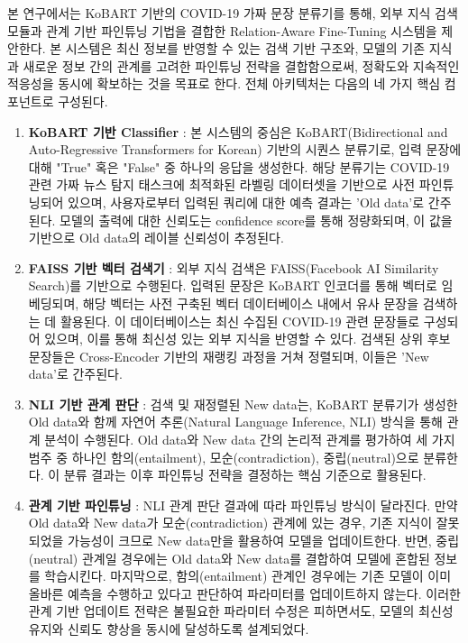 \documentclass[a4paper,fleqn]{cas-sc}
\begin{document}
본 연구에서는 KoBART 기반의 COVID-19 가짜 문장 분류기를 통해, 외부 지식 검색 모듈과 관계 기반 파인튜닝 기법을 결합한 Relation-Aware Fine-Tuning 시스템을 제안한다. 
본 시스템은 최신 정보를 반영할 수 있는 검색 기반 구조와, 모델의 기존 지식과 새로운 정보 간의 관계를 고려한 파인튜닝 전략을 결합함으로써, 정확도와 지속적인 적응성을 동시에 확보하는 것을 목표로 한다. 전체 아키텍처는 다음의 네 가지 핵심 컴포넌트로 구성된다.

\begin{enumerate}
    \item\textbf{KoBART 기반 Classifier} :
    본 시스템의 중심은 KoBART(Bidirectional and Auto-Regressive Transformers for Korean) 기반의 시퀀스 분류기로, 입력 문장에 대해 "True" 혹은 "False" 중 하나의 응답을 생성한다. 해당 분류기는 COVID-19 관련 가짜 뉴스 탐지 태스크에 최적화된 라벨링 데이터셋을 기반으로 사전 파인튜닝되어 있으며, 사용자로부터 입력된 쿼리에 대한 예측 결과는 'Old data'로 간주된다. 모델의 출력에 대한 신뢰도는 confidence score를 통해 정량화되며, 이 값을 기반으로 Old data의 레이블 신뢰성이 추정된다.

    \item\textbf{FAISS 기반 벡터 검색기} : 
    외부 지식 검색은 FAISS(Facebook AI Similarity Search)를 기반으로 수행된다. 입력된 문장은 KoBART 인코더를 통해 벡터로 임베딩되며, 해당 벡터는 사전 구축된 벡터 데이터베이스 내에서 유사 문장을 검색하는 데 활용된다. 이 데이터베이스는 최신 수집된 COVID-19 관련 문장들로 구성되어 있으며, 이를 통해 최신성 있는 외부 지식을 반영할 수 있다. 검색된 상위 후보 문장들은 Cross-Encoder 기반의 재랭킹 과정을 거쳐 정렬되며, 이들은 'New data'로 간주된다.

    \item\textbf{NLI 기반 관계 판단} : 
    검색 및 재정렬된 New data는, KoBART 분류기가 생성한 Old data와 함께 자연어 추론(Natural Language Inference, NLI) 방식을 통해 관계 분석이 수행된다. Old data와 New data 간의 논리적 관계를 평가하여 세 가지 범주 중 하나인 함의(entailment), 모순(contradiction), 중립(neutral)으로 분류한다. 이 분류 결과는 이후 파인튜닝 전략을 결정하는 핵심 기준으로 활용된다.
    
    \item\textbf{관계 기반 파인튜닝} : 
    NLI 관계 판단 결과에 따라 파인튜닝 방식이 달라진다. 만약 Old data와 New data가 모순(contradiction) 관계에 있는 경우, 기존 지식이 잘못되었을 가능성이 크므로 New data만을 활용하여 모델을 업데이트한다. 반면, 중립(neutral) 관계일 경우에는 Old data와 New data를 결합하여 모델에 혼합된 정보를 학습시킨다. 마지막으로, 함의(entailment) 관계인 경우에는 기존 모델이 이미 올바른 예측을 수행하고 있다고 판단하여 파라미터를 업데이트하지 않는다. 이러한 관계 기반 업데이트 전략은 불필요한 파라미터 수정은 피하면서도, 모델의 최신성 유지와 신뢰도 향상을 동시에 달성하도록 설계되었다.
\end{enumerate}
\end{document}
